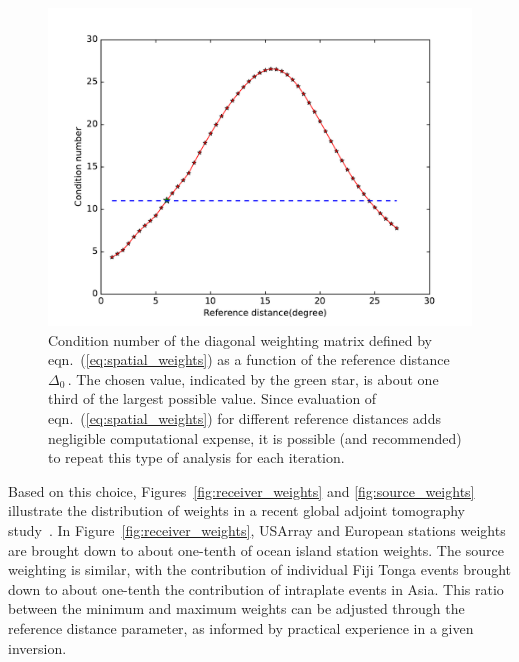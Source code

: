 \begin{figure}
    \centering 
 	\includegraphics[width=.95\textwidth]{ch-weighting/figures/source_weight_cond_num.pdf}
  \caption[Condition number curve of the diagonal weighting matrix]
  {\small{Condition number of the diagonal weighting matrix defined by eqn.~(\ref{eq:spatial_weights})
as a function of the reference distance~$\Delta_0$\,.
The chosen value, indicated by the green star, is about one third of the largest possible value.
Since evaluation of eqn.~(\ref{eq:spatial_weights}) for different reference distances adds negligible computational expense, it is possible (and recommended) to repeat this type of analysis for each iteration.
}}
\label{fig:weight_condnum}
\end{figure}

Based on this choice, Figures~\ref{fig:receiver_weights} and \ref{fig:source_weights} illustrate the
distribution of weights in a recent global adjoint tomography study~\cite{Lei2018}. In Figure~\ref{fig:receiver_weights},
USArray and European stations weights are brought down to about one-tenth of ocean island station weights. The source weighting is similar, with the contribution of individual Fiji Tonga events brought down to about one-tenth the contribution of intraplate events in Asia. This ratio between the minimum and maximum weights can be adjusted through the reference distance parameter, as informed by practical experience in a given inversion.

